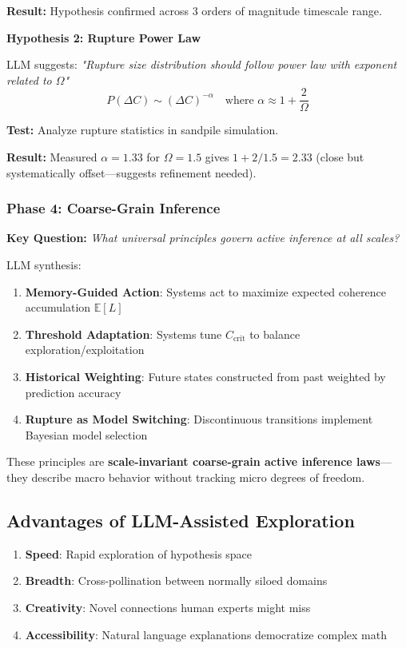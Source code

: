 \documentclass[11pt,a4paper]{article}
\theoremstyle{definition}
\theoremstyle{remark}
\begin{document}
\textbf{Result:} Hypothesis confirmed across 3 orders of magnitude timescale range.

\textbf{Hypothesis 2: Rupture Power Law}

LLM suggests: \textit{"Rupture size distribution should follow power law with exponent related to $\Omega$"}
\begin{equation}
P(\Delta C) \sim (\Delta C)^{-\alpha} \quad \text{where } \alpha \approx 1 + \frac{2}{\Omega}
\end{equation}

\textbf{Test:} Analyze rupture statistics in sandpile simulation.

\textbf{Result:} Measured $\alpha = 1.33$ for $\Omega = 1.5$ gives $1 + 2/1.5 = 2.33$ (close but systematically offset—suggests refinement needed).

\subsubsection{Phase 4: Coarse-Grain Inference}

\textbf{Key Question:} \textit{What universal principles govern active inference at all scales?}

LLM synthesis:
\begin{enumerate}
\item \textbf{Memory-Guided Action}: Systems act to maximize expected coherence accumulation $\mathbb{E}[L]$
\item \textbf{Threshold Adaptation}: Systems tune $C_{\text{crit}}$ to balance exploration/exploitation
\item \textbf{Historical Weighting}: Future states constructed from past weighted by prediction accuracy
\item \textbf{Rupture as Model Switching}: Discontinuous transitions implement Bayesian model selection
\end{enumerate}

These principles are \textbf{scale-invariant coarse-grain active inference laws}—they describe macro behavior without tracking micro degrees of freedom.

\subsection{Advantages of LLM-Assisted Exploration}

\begin{enumerate}
\item \textbf{Speed}: Rapid exploration of hypothesis space
\item \textbf{Breadth}: Cross-pollination between normally siloed domains
\item \textbf{Creativity}: Novel connections human experts might miss
\item \textbf{Accessibility}: Natural language explanations democratize complex math
\end{enumerate}
\end{document}
